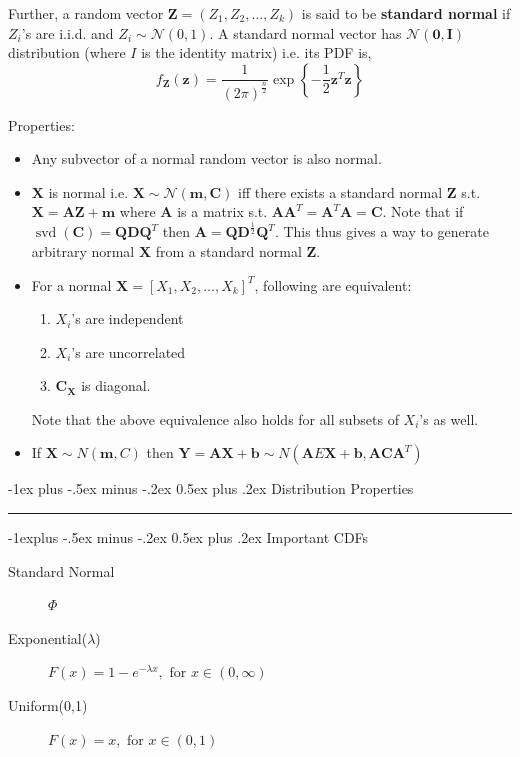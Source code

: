 \documentclass[10pt,landscape]{article}
\makeatletter
\renewcommand{\section}{\@startsection{section}{1}{0mm}%
{-1ex plus -.5ex minus -.2ex}%
{0.5ex plus .2ex}%
{\normalfont\large\bfseries}}
\renewcommand{\subsection}{\@startsection{subsection}{2}{0mm}%
{-1explus -.5ex minus -.2ex}%
{0.5ex plus .2ex}%
{\normalfont\normalsize\bfseries}}
\makeatother
\begin{document}
\begin{multicols*}{3}
        Further, a random vector $\mathbf{Z} = (Z_1, Z_2, \dots, Z_k)$ is said to be \textbf{standard normal} if $Z_{i}$'s are i.i.d. and $Z_{i} \sim \mathcal{N}(0,1)$. A standard normal vector has $\mathcal{N}(\mathbf{0}, \mathbf{I})$ distribution (where $I$ is the identity matrix) i.e. its PDF is,
        \[
            f_{\mathbf{Z}}(\mathbf{z})=\frac{1}{(2 \pi)^{\frac{n}{2}}} \exp \left\{-\frac{1}{2} \mathbf{z}^{T} \mathbf{z}\right\}
        \]

        Properties:
        \begin{itemize}
            \item Any subvector of a normal random vector is also normal.
            \item $\mathbf{X}$ is normal i.e. $\mathbf{X} \sim \mathcal{N}(\mathbf{m}, \mathbf{C})$ iff there exists a standard normal $\mathbf{Z}$ s.t. $\mathbf{X = AZ + m}$ where $\mathbf{A}$ is a matrix s.t. $\mathbf{A} \mathbf{A}^{T}= \mathbf{A}^{T}\mathbf{A}=\mathbf{C}$. Note that if $\operatorname{svd}(\mathbf{C})=\mathbf{Q} \mathbf{D} \mathbf{Q}^T$ then $\mathbf{A}=\mathbf{Q} \mathbf{D}^{\frac{1}{2}} \mathbf{Q}^T$. This thus gives a way to generate arbitrary normal $\mathbf{X}$ from a standard normal $\mathbf{Z}$.

            \item For a normal $\mathbf{X} = [X_1, X_2, \dots, X_k]^T$, following are equivalent:
            \begin{enumerate}
                \item $X_i$'s are independent
                \item $X_i$'s are uncorrelated
                \item $\mathbf{C_X}$ is diagonal.
            \end{enumerate}
            Note that the above equivalence also holds for all subsets of $X_i$'s as well.
            \item If $\mathbf{X} \sim N(\mathbf{m}, {C})$ then $\mathbf{Y=A X+b} \sim N(\mathbf{A}E\mathbf{X}+\mathbf{b},\mathbf{A} \mathbf{C} \mathbf{A}^T)$
        \end{itemize}


        \section{Distribution Properties} \smallskip \hrule height 2pt \smallskip

        \subsection{Important CDFs}
        \begin{description}
            \item[Standard Normal] $\Phi$
            \item[Exponential($\lambda$)] $F(x) = 1 - e^{-\lambda x}, \textrm{ for } x \in (0, \infty)$
            \item[Uniform(0,1)] $F(x) = x, \textrm{ for } x \in (0, 1)$
        \end{description}


\end{multicols*}
\end{document}
